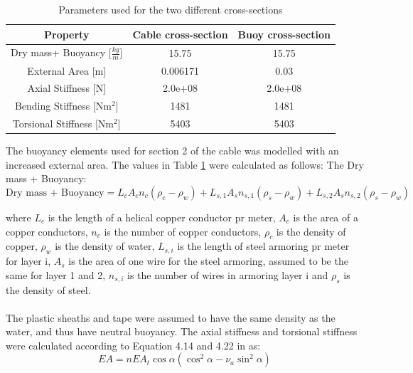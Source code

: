 \begin{table} [H]
\centering
\begin{tabular}{ |c|c|c|}
\hline
Property& Cable cross-section & Buoy cross-section \\
 \hline
 \hline
Dry mass+ Buoyancy [$\frac{kg}{m}$] & 15.75 & 15.75\\
External Area [m]& 0.006171 & 0.03\\
Axial Stiffness [N] & 2.0e+08 & 2.0e+08\\
Bending Stiffness [Nm$^2$] & 1481 & 1481\\
Torsional Stiffness [Nm$^2$] & 5403 & 5403\\
 \hline
\end{tabular}
\caption{Parameters used for the two different cross-sections}
\label{table:crosssima}
\end{table}
\noindent The buoyancy elements used for section 2 of the cable was modelled with an increased external area. The values in Table \ref{table:crosssima} were calculated as follows:\newline
\newline 
\noindent The Dry mass + Buoyancy: 
\begin{equation}
\text{Dry mass + Buoyancy}=L_{c} A_cn_c (\rho_c-\rho_w) + L_{s,1} A_{s}n_{s,1} (\rho_s-\rho_w)+L_{s,2} A_{s}n_{s,2} (\rho_s-\rho_w)
\end{equation}

\noindent where $L_c$ is the length of a helical copper conductor pr meter, $A_c$ is the area of a copper conductors, $n_c$ is the number of copper conductors, $\rho_c$ is the density of copper, $\rho_w$ is the density of water, $L_{s,i}$ is the length of steel armoring pr meter for layer i, $A_s$ is the area of one wire for the steel armoring, assumed to be the same for layer 1 and 2, $n_{s,i}$ is the number of wires in armoring layer i and $\rho_s$ is the density of steel.\\\\ The plastic sheaths and tape were assumed to have the same density as the water, and thus have neutral buoyancy. \newline
\newline 
The axial stiffness and torsional stiffness were calculated according to Equation 4.14 and 4.22 in \cite{Savik2016} as:
\begin{equation}
    EA=nEA_t \cos\alpha(\cos^2\alpha-\nu_a \sin^2\alpha)
\end{equation}


